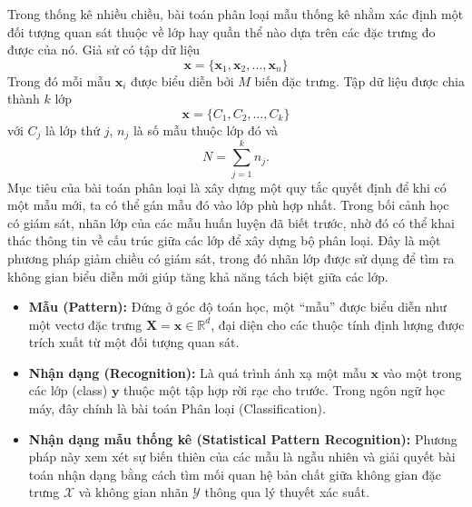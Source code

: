 Trong thống kê nhiều chiều, bài toán phân loại mẫu thống kê nhằm xác định một đối tượng quan sát thuộc về lớp hay quần thể nào dựa trên các đặc trưng đo được của nó. Giả sử có tập dữ liệu
\begin{equation*}
	\bm{x} = \{\bm{x}_1, \bm{x}_2, \dots, \bm{x}_n\}
\end{equation*}
Trong đó mỗi mẫu $\bm{x}_i$ được biểu diễn bởi $M$ biến đặc trưng. Tập dữ liệu được chia thành $k$ lớp
\begin{equation*}
	\bm{x} = \{C_1, C_2, \dots, C_k\}
\end{equation*}
với $C_j$ là lớp thứ $j$, $n_j$ là số mẫu thuộc lớp đó và
\begin{equation*}
	N=\sum_{j=1}^{k}n_j.
\end{equation*}
\hspace*{0.5cm}Mục tiêu của bài toán phân loại là xây dựng một quy tắc quyết định để khi có một mẫu mới, ta có thể gán mẫu đó vào lớp phù hợp nhất. Trong bối cảnh học có giám sát, nhãn lớp của các mẫu huấn luyện đã biết trước, nhờ đó có thể khai thác thông tin về cấu trúc giữa các lớp để xây dựng bộ phân loại. Đây là một phương pháp giảm chiều có giám sát, trong đó nhãn lớp được sử dụng để tìm ra không gian biểu diễn mới giúp tăng khả năng tách biệt giữa các lớp.
\begin{itemize}
	\item \textbf{Mẫu (Pattern):} Đứng ở góc độ toán học, một ``mẫu'' được biểu diễn như một vectơ đặc trưng $\mathbf{X} = \bm{x} \in \mathbb{R}^d$, đại diện cho các thuộc tính định lượng được trích xuất từ một đối tượng quan sát.
	
	\item \textbf{Nhận dạng (Recognition):} Là quá trình ánh xạ một mẫu $\bm{x}$ vào một trong các lớp (class) $\mathbf{y}$ thuộc một tập hợp rời rạc cho trước. Trong ngôn ngữ học máy, đây chính là bài toán Phân loại (Classification).
	
	\item \textbf{Nhận dạng mẫu thống kê (Statistical Pattern Recognition):} Phương pháp này xem xét sự biến thiên của các mẫu là ngẫu nhiên và giải quyết bài toán nhận dạng bằng cách tìm mối quan hệ bản chất giữa không gian đặc trưng $\mathcal{X}$ và không gian nhãn $\mathcal{Y}$ thông qua lý thuyết xác suất.
\end{itemize}
